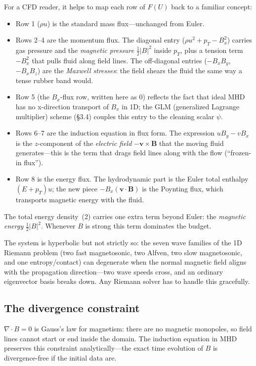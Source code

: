 \documentclass[11pt]{article}
\begin{document}
For a CFD reader, it helps to map each row of $F(U)$ back to a familiar concept:
\begin{itemize}
  \item Row 1 ($\rho u$) is the standard mass flux---unchanged from Euler.
  \item Rows 2--4 are the momentum flux.  The diagonal entry ($\rho u^{2} + p_T - B_x^{2}$) carries gas pressure and the \emph{magnetic pressure} $\tfrac{1}{2}|B|^{2}$ inside $p_T$, plus a tension term $-B_x^{2}$ that pulls fluid along field lines. The off-diagonal entries ($-B_xB_y$, $-B_xB_z$) are the \emph{Maxwell stresses}: the field shears the fluid the same way a tense rubber band would.
  \item Row 5 (the $B_x$-flux row, written here as $0$) reflects the fact that ideal MHD has no x-direction transport of $B_x$ in 1D; the GLM (generalized Lagrange multiplier) scheme (\S3.4) couples this entry to the cleaning scalar $\psi$.
  \item Rows 6--7 are the induction equation in flux form.  The expression $uB_y - vB_x$ is the $z$-component of the \emph{electric field} $-\mathbf{v}\times\mathbf{B}$ that the moving fluid generates---this is the term that drags field lines along with the flow (``frozen-in flux'').
  \item Row 8 is the energy flux.  The hydrodynamic part is the Euler total enthalpy $(E + p_T)u$; the new piece $-B_x(\mathbf{v}\cdot\mathbf{B})$ is the Poynting flux, which transports magnetic energy with the fluid.
\end{itemize}
The total energy density~(2) carries one extra term beyond Euler: the \emph{magnetic energy} $\tfrac{1}{2}|B|^{2}$.  Whenever $B$ is strong this term dominates the budget.

The system is hyperbolic but not strictly so: the seven wave families of the 1D Riemann problem (two fast magnetosonic, two Alfven, two slow magnetosonic, and one entropy/contact) can degenerate when the normal magnetic field aligns with the propagation direction---two wave speeds cross, and an ordinary eigenvector basis breaks down. Any Riemann solver has to handle this gracefully.

\subsection{The divergence constraint}

$\nabla\cdot B = 0$ is Gauss's law for magnetism: there are no magnetic monopoles, so field lines cannot start or end inside the domain.  The induction equation in MHD preserves this constraint analytically---the exact time evolution of $B$ is divergence-free if the initial data are.
\end{document}
